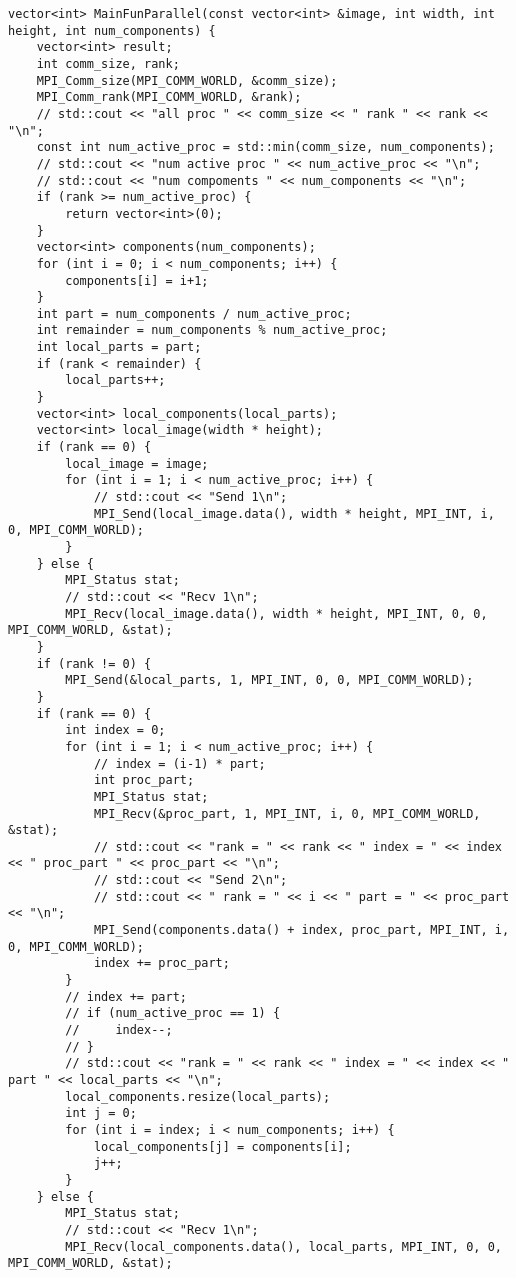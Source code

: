 \documentclass{report}
\begin{document}
\begin{lstlisting}
vector<int> MainFunParallel(const vector<int> &image, int width, int height, int num_components) {
    vector<int> result;
    int comm_size, rank;
    MPI_Comm_size(MPI_COMM_WORLD, &comm_size);
    MPI_Comm_rank(MPI_COMM_WORLD, &rank);
    // std::cout << "all proc " << comm_size << " rank " << rank << "\n";
    const int num_active_proc = std::min(comm_size, num_components);
    // std::cout << "num active proc " << num_active_proc << "\n";
    // std::cout << "num compoments " << num_components << "\n";
    if (rank >= num_active_proc) {
        return vector<int>(0);
    }
    vector<int> components(num_components);
    for (int i = 0; i < num_components; i++) {
        components[i] = i+1;
    }
    int part = num_components / num_active_proc;
    int remainder = num_components % num_active_proc;
    int local_parts = part;
    if (rank < remainder) {
        local_parts++;
    }
    vector<int> local_components(local_parts);
    vector<int> local_image(width * height);
    if (rank == 0) {
        local_image = image;
        for (int i = 1; i < num_active_proc; i++) {
            // std::cout << "Send 1\n";
            MPI_Send(local_image.data(), width * height, MPI_INT, i, 0, MPI_COMM_WORLD);
        }
    } else {
        MPI_Status stat;
        // std::cout << "Recv 1\n";
        MPI_Recv(local_image.data(), width * height, MPI_INT, 0, 0, MPI_COMM_WORLD, &stat);
    }
    if (rank != 0) {
        MPI_Send(&local_parts, 1, MPI_INT, 0, 0, MPI_COMM_WORLD);
    }
    if (rank == 0) {
        int index = 0;
        for (int i = 1; i < num_active_proc; i++) {
            // index = (i-1) * part;
            int proc_part;
            MPI_Status stat;
            MPI_Recv(&proc_part, 1, MPI_INT, i, 0, MPI_COMM_WORLD, &stat);
            // std::cout << "rank = " << rank << " index = " << index << " proc_part " << proc_part << "\n";
            // std::cout << "Send 2\n";
            // std::cout << " rank = " << i << " part = " << proc_part << "\n";
            MPI_Send(components.data() + index, proc_part, MPI_INT, i, 0, MPI_COMM_WORLD);
            index += proc_part;
        }
        // index += part;
        // if (num_active_proc == 1) {
        //     index--;
        // }
        // std::cout << "rank = " << rank << " index = " << index << " part " << local_parts << "\n";
        local_components.resize(local_parts);
        int j = 0;
        for (int i = index; i < num_components; i++) {
            local_components[j] = components[i];
            j++;
        }
    } else {
        MPI_Status stat;
        // std::cout << "Recv 1\n";
        MPI_Recv(local_components.data(), local_parts, MPI_INT, 0, 0, MPI_COMM_WORLD, &stat);

\end{lstlisting}
\end{document}
